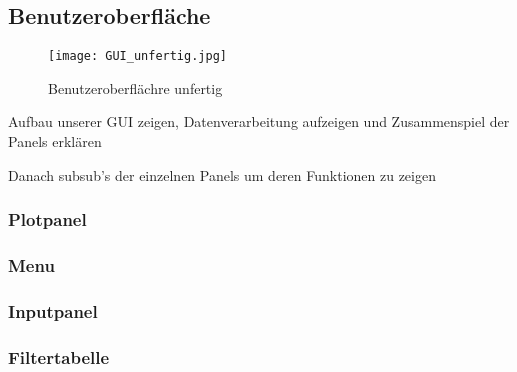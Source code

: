 \subsection{Benutzeroberfläche} \label{subsec:benutzeroberflaeche}

\begin{figure}[H]
		\centering
		\texttt{[image: GUI\_unfertig.jpg]}
		\label{fig:gui}
		\caption{Benutzeroberflächre unfertig}
\end{figure}


Aufbau unserer GUI zeigen, Datenverarbeitung aufzeigen und Zusammenspiel der Panels erklären

Danach subsub's der einzelnen Panels um deren Funktionen zu zeigen


\subsubsection{Plotpanel} \label{subsubsec:plotpanel}



\subsubsection{Menu}\label{subsubsec:menu}


\subsubsection{Inputpanel} \label{subsubsec:inputpanel}


\subsubsection{Filtertabelle} \label{subsubsec:filtertabelle}

